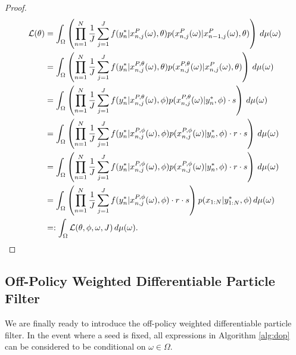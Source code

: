 \documentclass{article}
\begin{document}
\begin{proof}
    
    \begin{align}
         \mathcal{L}(\theta) 
         &= \int_\Omega \left(
         \prod_{n=1}^N \frac{1}{J} \sum_{j=1}^J f(y_n^* | x_{n,j}^P(\omega), \theta) p(x_{n,j}^P(\omega) | x_{n-1,j}^P(\omega), \theta) \right) \, d\mu(\omega) \\
         &= \int_\Omega \left(
         \prod_{n=1}^N \frac{1}{J} \sum_{j=1}^J f(y_n^* | x_{n,j}^{P,\theta}(\omega), \theta) p(x_{n,j}^{P,\theta}(\omega) | x_{n,j}^P(\omega), \theta) \right) \, d\mu(\omega) \\
         &= \int_\Omega \left(
         \prod_{n=1}^N \frac{1}{J} \sum_{j=1}^J f(y_n^* | x_{n,j}^{P,\theta}(\omega), \phi) p(x_{n,j}^{P,\theta}(\omega) | y_n^*, \phi) \cdot s  \right) \, d\mu(\omega) \\
         &= \int_\Omega \left(
         \prod_{n=1}^N \frac{1}{J} \sum_{j=1}^J f(y_n^* | x_{n,j}^{P,\phi}(\omega), \phi) p(x_{n,j}^{P,\phi}(\omega) | y_n^*, \phi) \cdot r \cdot s \right) \, d\mu(\omega) \\
         &= \int_\Omega \left(
         \prod_{n=1}^N \frac{1}{J} \sum_{j=1}^J f(y_n^* | x_{n,j}^{P,\phi}(\omega), \phi) p(x_{n,j}^{P, \phi}(\omega) | y_n^*, \phi) \cdot r \cdot s \right) \, d\mu(\omega) \\
         &= \int_\Omega \left(
         \prod_{n=1}^N \frac{1}{J} \sum_{j=1}^J f(y_n^* | x_{n,j}^{P,\phi}(\omega), \phi) \cdot r \cdot s \right)  p(x_{1:N} | y_{1:N}^*, \phi) \,  d\mu(\omega) \\
         &=: \int_\Omega \mathcal{L}(\theta,\phi,\omega, J)\, d\mu(\omega).
     \end{align}
\end{proof}


\subsection{Off-Policy Weighted Differentiable Particle Filter}

We are finally ready to introduce the off-policy weighted differentiable particle filter. In the event where a seed is fixed, all expressions in Algorithm \ref{alg:dop} can be considered to be conditional on $\omega \in \Omega$.  
\end{document}
